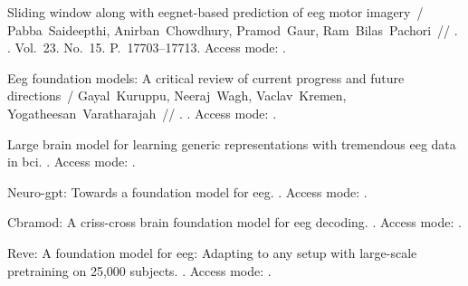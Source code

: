 \expandafter\long\expandafter\gdef\csname fullcite@10.1109/jsen.2023.3270281\endcsname{%
Sliding window along with eegnet-based prediction of eeg motor imagery~/
  Pabba~Saideepthi, Anirban~Chowdhury, Pramod~Gaur, Ram~Bilas~Pachori~//
  \href{http://dx.doi.org/10.1109/jsen.2023.3270281}{}. \BibDash
{}. \BibDash
\newblock Vol.~23. No.~15. \BibDash
\newblock P.~17703--17713. \BibDash
\newblock Access mode: .
}

\expandafter\long\expandafter\gdef\csname fullcite@10.1088/1741-2552/ae4455\endcsname{%
Eeg foundation models: A critical review of current progress and future
  directions~/ Gayal~Kuruppu, Neeraj~Wagh, Vaclav~Kremen,
  Yogatheesan~Varatharajah~//
  \href{http://dx.doi.org/10.1088/1741-2552/ae4455}{}. \BibDash
{}. \BibDash
\newblock Access mode: .
}

\expandafter\long\expandafter\gdef\csname fullcite@10.48550/arXiv.2405.18765\endcsname{%
 Large brain model for learning
  generic representations with tremendous eeg data in bci. \BibDash
{}. \BibDash
\newblock Access mode: .
}

\expandafter\long\expandafter\gdef\csname fullcite@10.48550/arXiv.2311.03764\endcsname{%
 Neuro-gpt: Towards a foundation
  model for eeg. \BibDash
{}. \BibDash
\newblock Access mode: .
}

\expandafter\long\expandafter\gdef\csname fullcite@10.48550/arXiv.2412.07236\endcsname{%
 Cbramod: A criss-cross brain
  foundation model for eeg decoding. \BibDash
{}. \BibDash
\newblock Access mode: .
}

\expandafter\long\expandafter\gdef\csname fullcite@10.48550/arXiv.2510.21585\endcsname{%
 Reve: A foundation model for
  eeg: Adapting to any setup with large-scale pretraining on 25,000 subjects.
  \BibDash
{}. \BibDash
\newblock Access mode: .
}


